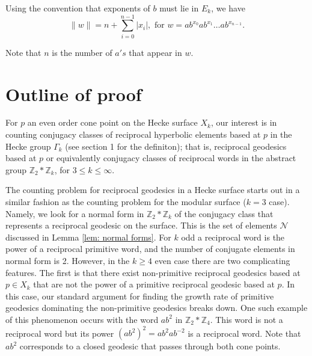 \documentclass[11pt]{amsart}
\numberwithin{equation}{section}
\theoremstyle{plain}
\begin{document}
Using  the  convention that   exponents of $b$ must lie in $E_{k}$, 
we have 
$$
\| w \| = n+ \sum_{i=0}^{n-1}|x_i|,  \text{    for   } w=ab^{x_0}ab^{x_1}\dots ab^{x_{n-1}}.
$$

Note that $n$ is the number of $a's$ that appear in $w$.





\section{Outline of proof}
\label{countingbinarywords}


For $p$ an even order cone point on the Hecke surface $X_{k}$, our interest is in   counting conjugacy classes of reciprocal hyperbolic elements based at $p$ in  the Hecke group 
$\Gamma_{k}$ (see section 1 for the definiton); that is, reciprocal geodesics  based at  $p$  or equivalently 
conjugacy classes of reciprocal words  in the abstract group 
$\mathbb{Z}_2 \ast \mathbb{Z}_k $, for $3\leq k\leq\infty$.

The  counting problem for reciprocal geodesics in a  Hecke surface starts out in a similar fashion as  the counting problem for the modular surface ($k=3$ case).  Namely, we look for a normal form in $\mathbb{Z}_2 \ast \mathbb{Z}_k$ of the conjugacy class that represents a reciprocal geodesic on the surface. This is the set of elements $\mathcal{N}$ discussed in 
Lemma \ref{lem: normal forms}. For $k$ odd a reciprocal word is the power of a reciprocal primitive word, and the number of conjugate elements in normal form is 2.
However, in the  $k \geq 4$ even case
there are two complicating features. The first is that there exist non-primitive reciprocal geodesics  based at $p \in X_{k}$ that are not the power of a primitive reciprocal geodesic based at $p$.  In this case, our standard argument for finding the growth rate of primitive geodesics dominating the non-primitive geodesics breaks down.  One such example  of this phenomenon occurs with  the  word 
$ab^{2}$ in $\mathbb{Z}_{2} \ast  \mathbb{Z}_{4}$.  This word 
is not a reciprocal word but its power  $(ab^{2})^{2}=ab^2ab^{-2}$ 
is a reciprocal word.  Note that $ab^{2}$ corresponds to a closed geodesic that passes through both cone points.
\end{document}
